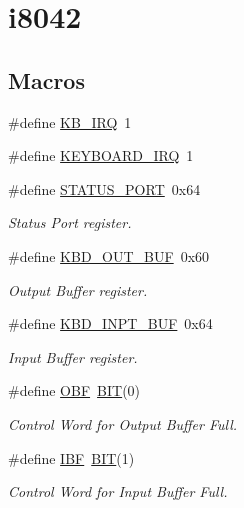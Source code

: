 \hypertarget{group__i8042}{}\section{i8042}
\label{group__i8042}
\subsection*{Macros}
\begin{DoxyCompactItemize}
\item 
\#define \hyperlink{group__i8042_gae36fc325bc821e866e90d0e66f9cc168}{K\+B\+\_\+\+I\+RQ}~1
\item 
\#define \hyperlink{group__i8042_ga2d17911b50c0aeebb2e3325c5b36d4f2}{K\+E\+Y\+B\+O\+A\+R\+D\+\_\+\+I\+RQ}~1
\item 
\#define \hyperlink{group__i8042_ga923231d2e45aaea2dbab3532b06c2311}{S\+T\+A\+T\+U\+S\+\_\+\+P\+O\+RT}~0x64
\begin{DoxyCompactList}\small\item\em Status Port register. \end{DoxyCompactList}\item 
\#define \hyperlink{group__i8042_gaeff3162e464a9081f73e3765f199d7c1}{K\+B\+D\+\_\+\+O\+U\+T\+\_\+\+B\+UF}~0x60
\begin{DoxyCompactList}\small\item\em Output Buffer register. \end{DoxyCompactList}\item 
\#define \hyperlink{group__i8042_gae1f561b740c8aed366ab0f6618e391f3}{K\+B\+D\+\_\+\+I\+N\+P\+T\+\_\+\+B\+UF}~0x64
\begin{DoxyCompactList}\small\item\em Input Buffer register. \end{DoxyCompactList}\item 
\#define \hyperlink{group__i8042_ga45967c9e25447ba853cf6fb4ac545fe6}{O\+BF}~\hyperlink{tools_8h_a3a8ea58898cb58fc96013383d39f482c}{B\+IT}(0)
\begin{DoxyCompactList}\small\item\em Control Word for Output Buffer Full. \end{DoxyCompactList}\item 
\#define \hyperlink{group__i8042_ga3c48b10907056351582baf9f6478598e}{I\+BF}~\hyperlink{tools_8h_a3a8ea58898cb58fc96013383d39f482c}{B\+IT}(1)
\begin{DoxyCompactList}\small\item\em Control Word for Input Buffer Full. \end{DoxyCompactList}\item 

\end{DoxyCompactItemize}
